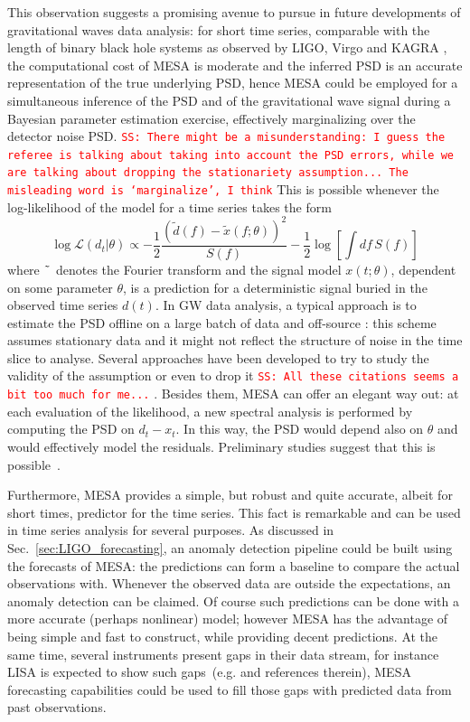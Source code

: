 \documentclass[twocolumn,showpacs,preprintnumbers,nofootinbib,prd,
superscriptaddress,10pt]{revtex4-1}
\newcommand{\sschmidt}[1]{{\textcolor{red}{\texttt{SS: #1}} }}
\begin{document}
This observation suggests a promising avenue to pursue in future developments of gravitational waves data analysis: for short time series, comparable with the length of binary black hole systems as observed by LIGO, Virgo and KAGRA \cite{LIGO_2015, Virgo_2014, KAGRA_2012, KAGRA_2013}, the computational cost of MESA is moderate and the inferred PSD is an accurate representation of the true underlying PSD, hence MESA could be employed for a simultaneous inference of the PSD and of the gravitational wave signal during a Bayesian parameter estimation exercise, effectively marginalizing over the detector noise PSD.
\sschmidt{There might be a misunderstanding: I guess the referee is talking about taking into account the PSD errors, while we are talking about dropping the stationariety assumption... The misleading word is `marginalize', I think}
This is possible whenever the log-likelihood of the model for a time series takes the form
\begin{equation}
	\log\mathcal{L}(d_t | \theta) \propto  -\frac{1}{2} \frac{(\tilde{d}(f)- \tilde{x}(f;\theta))^2}{S(f)} - \frac{1}{2}\log\left[\int  df\,S(f)\right]
\end{equation}
where $\tilde{\hphantom{a}}$ denotes the Fourier transform and the signal model $x(t;\theta)$, dependent on some parameter $\theta$, is a prediction for a deterministic signal buried in the observed time series $d(t)$.
In GW data analysis, a typical approach is to estimate the PSD offline on a large batch of data and off-source \cite{lalinference}: this scheme assumes stationary data and it might not reflect the structure of noise in the time slice to analyse.
Several approaches have been developed to try to study the validity of the assumption or even to drop it \cite{R_ver_2010, R_ver_2011, Littenberg_2013, Biscoveanu_2020, talbot2020gravitationalwave, Edwards_2020, Edwards_2015} \sschmidt{All these citations seems a bit too much for me...}.
Besides them, MESA can offer an elegant way out: at each evaluation of the likelihood, a new spectral analysis is performed by computing the PSD on $d_t-x_t$.
In this way, the PSD would depend also on $\theta$ and would effectively model the residuals. Preliminary studies suggest that this is possible~\cite{martini_thesis}.

Furthermore, MESA provides a simple, but robust and quite accurate, albeit for short times, predictor for the time series. This fact is remarkable and can be used in time series analysis for several purposes. As discussed in Sec.~\ref{sec:LIGO_forecasting}, an anomaly detection pipeline could be built using the forecasts of MESA: the predictions can form a baseline to compare the actual observations with. Whenever the observed data are outside the expectations, an anomaly detection can be claimed. Of course such predictions can be done with a more accurate (perhaps nonlinear) model; however MESA has the advantage of being simple and fast to construct, while providing decent predictions. At the same time, several instruments present gaps in their data stream, for instance LISA is expected to show such gaps~(e.g. \cite{lisa_gaps} and references therein), MESA forecasting capabilities could be used to fill those gaps with predicted data from past observations.
\end{document}
